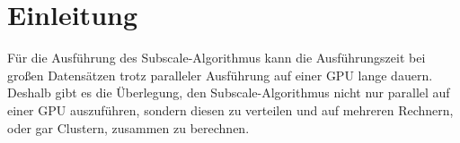 \section{Einleitung}
Für die Ausführung des Subscale-Algorithmus kann die Ausführungszeit bei großen Datensätzen trotz paralleler Ausführung auf einer GPU lange dauern. Deshalb gibt es die Überlegung, den Subscale-Algorithmus nicht nur parallel auf einer GPU auszuführen, sondern diesen zu verteilen und auf mehreren Rechnern, oder gar Clustern, zusammen zu berechnen.
